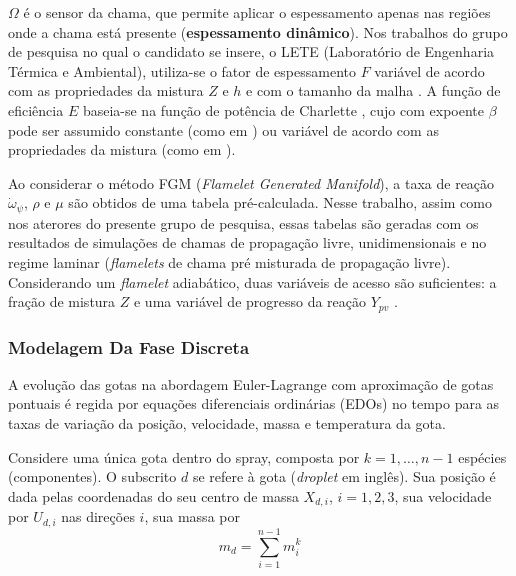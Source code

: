 $\Omega$ é o sensor da chama, que permite aplicar o espessamento apenas nas regiões onde a chama está presente (\textbf{espessamento dinâmico}).
Nos trabalhos do grupo de pesquisa no qual o candidato se insere, o LETE (Laboratório de Engenharia Térmica e Ambiental), utiliza-se o fator de espessamento $F$ variável de acordo com as propriedades da mistura $Z$ e $h$ e com o tamanho da malha \cite{SacomanoF2017PhD,SacomanoF2017CF}.
A função de eficiência $E$ baseia-se na função de potência de Charlette \cite{CharletteF2002}, cujo com expoente $\beta$ pode ser assumido constante (como em \cite{SacomanoF2017PhD,SacomanoF2017CF,SacomanoF2019IJHMT,ShastryV2023,SekularacN2024}) ou variável de acordo com as propriedades da mistura (como em \cite{SacomanoF2020CF}).

Ao considerar o método FGM (\emph{Flamelet Generated Manifold}), a taxa de reação $\dot \omega_\psi$, $\rho$ e $\mu$ são obtidos de uma tabela pré-calculada.
Nesse trabalho, assim como nos aterores do presente grupo de pesquisa, essas tabelas são geradas com os resultados de simulações de chamas de propagação livre, unidimensionais e no regime laminar (\emph{flamelets} de chama pré misturada de propagação livre).
Considerando um \emph{flamelet} adiabático, duas variáveis de acesso são suficientes: a fração de mistura $Z$ e uma variável de progresso da reação $Y_{pv}$ \cite{PoinsotVeynante2005}.
    

\subsubsection{Modelagem Da Fase Discreta} \label{sec:gotas}

A evolução das gotas na abordagem Euler-Lagrange com aproximação de gotas pontuais é regida por equações diferenciais ordinárias (EDOs) no tempo para as taxas de variação da posição, velocidade, massa e temperatura da gota.

Considere uma única gota dentro do spray, composta por $k=1,\ldots,n-1$ espécies (componentes).
O subscrito $d$ se refere à gota (\emph{droplet} em inglês).
Sua posição é dada pelas coordenadas do seu centro de massa $X_{d,i}$, $i=1,2,3$, sua velocidade por $U_{d,i}$ nas direções $i$, sua massa por 
\vspace{-6pt}
\begin{equation}    
    m_d = \sum_{i=1}^{n-1} m_{i}^k
\end{equation} 
\vspace{-24pt}

